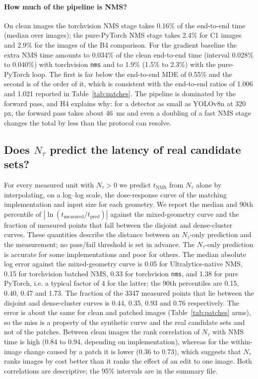 \documentclass[a4paper,fleqn]{cas-dc}
\newcommand{\Ntau}{N_{\tau}}
\begin{document}
\paragraph{How much of the pipeline is NMS?}
On clean images the torchvision NMS stage takes 0.16\% of the end-to-end time (median over images); the pure-PyTorch NMS stage takes 2.4\% for C1 images and 2.9\% for the images of the B4 comparison. For the gradient baseline the extra NMS time amounts to 0.034\% of the clean end-to-end time (interval 0.028\% to 0.040\%) with torchvision \texttt{nms} and to 1.9\% (1.5\% to 2.3\%) with the pure-PyTorch loop. The first is far below the end-to-end MDE of 0.55\% and the second is of the order of it, which is consistent with the end-to-end ratios of 1.006 and 1.021 reported in Table~\ref{tab:patches}. The pipeline is dominated by the forward pass, and H4 explains why: for a detector as small as YOLOv8n at 320 px, the forward pass takes about 46~ms and even a doubling of a fast NMS stage changes the total by less than the protocol can resolve.

\subsection{Does $\Ntau$ predict the latency of real candidate sets?}
For every measured unit with $\Ntau>0$ we predict $t_{\mathrm{NMS}}$ from $\Ntau$ alone by interpolating, on a log--log scale, the dose-response curve of the matching implementation and input size for each geometry. We report the median and 90th percentile of $|\ln(t_{\mathrm{measured}}/t_{\mathrm{pred}})|$ against the mixed-geometry curve and the fraction of measured points that fall between the disjoint and dense-cluster curves. These quantities describe the distance between an $\Ntau$-only prediction and the measurement; no pass/fail threshold is set in advance.
The $\Ntau$-only prediction is accurate for some implementations and poor for others. The median absolute log error against the mixed-geometry curve is 0.05 for Ultralytics-native NMS, 0.15 for torchvision batched NMS, 0.33 for torchvision \texttt{nms}, and 1.38 for pure PyTorch, i.e. a typical factor of 4 for the latter; the 90th percentiles are 0.15, 0.40, 0.47 and 1.73. The fraction of the 3347 measured points that lie between the disjoint and dense-cluster curves is 0.44, 0.35, 0.93 and 0.76 respectively. The error is about the same for clean and patched images (Table~\ref{tab:patches} arms), so the miss is a property of the synthetic curve and the real candidate sets and not of the patches. Between clean images the rank correlation of $\Ntau$ with NMS time is high (0.84 to 0.94, depending on implementation), whereas for the within-image change caused by a patch it is lower (0.36 to 0.73), which suggests that $\Ntau$ ranks images by cost better than it ranks the effect of an edit to one image. Both correlations are descriptive; the 95\% intervals are in the summary file.
\end{document}
